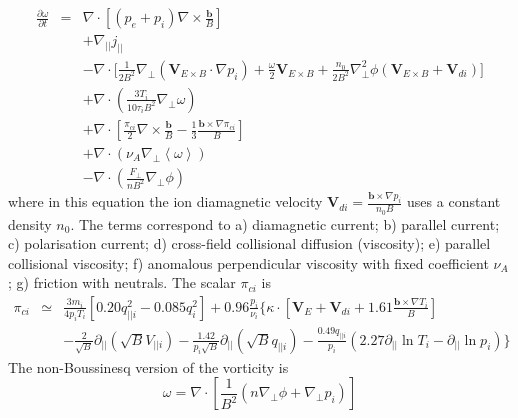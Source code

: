 \documentclass[12pt,a4paper]{article}
\begin{document}
\begin{subequations}
\begin{eqnarray}
%
%
  \frac{\partial\omega}{\partial t} &=& \nabla\cdot\left[\left(p_e + p_i\right)\nabla\times\frac{\mathbf{b}}{B}\right] \label{eq:vort_diamag} \\
  && + \nabla_{||}j_{||} \label{eq:vort_jpar} \\
  && - \nabla\cdot\Big[ \frac{1}{2B^2}\nabla_\perp\left(\mathbf{V}_{E\times B}\cdot\nabla p_i\right) + \frac{\omega}{2}\mathbf{V}_{E\times B}  +\frac{n_0}{2B^2}\nabla_\perp^2\phi \left(\mathbf{V}_{E\times B} + \mathbf{V}_{di}\right) \Big] \label{eq:vort_c} \\
  && + \nabla\cdot\left(\frac{3T_i}{10\tau_iB^2}\nabla_\perp\omega\right) \label{eq:vort_perpvis} \\
  && + \nabla\cdot\left[\frac{\pi_{ci}}{2}\nabla\times\frac{\mathbf{b}}{B} - \frac{1}{3}\frac{\mathbf{b}\times\nabla\pi_{ci}}{B}\right] \\
  && + \nabla\cdot\left(\nu_A\nabla_\perp\left<\omega\right>\right) \\
  && - \nabla\cdot\left(\frac{F_\perp}{nB^2}\nabla_\perp\phi\right)
\end{eqnarray}
\end{subequations}
where in this equation the ion diamagnetic velocity $\mathbf{V}_{di} = \frac{\mathbf{b}\times\nabla p_i}{n_0 B}$ uses a constant density $n_0$. The terms correspond to a) diamagnetic current; b) parallel current; c) polarisation current; d) cross-field collisional diffusion (viscosity); e) parallel collisional viscosity; f) anomalous perpendicular viscosity with fixed coefficient $\nu_A$; g) friction with neutrals. The scalar $\pi_{ci}$ is
\begin{eqnarray}
  \pi_{ci} &\simeq& \frac{3m_i}{4p_iT_i}\left[0.20q_{||i}^2 - 0.085q_i^2\right] + 0.96\frac{p_i}{\nu_i}\Bigg\{\kappa\cdot\left[\mathbf{V}_E + \mathbf{V}_{di} + 1.61\frac{\mathbf{b}\times\nabla T_i}{B}\right] \nonumber \\
  && - \frac{2}{\sqrt{B}}\partial_{||}\left(\sqrt{B}V_{||i}\right) - \frac{1.42}{p_i\sqrt{B}}\partial_{||}\left(\sqrt{B}q_{||i}\right) - \frac{0.49q_{||i}}{p_i}\left(2.27\partial_{||}\ln T_i - \partial_{||}\ln p_i\right)\Bigg\} \label{eq:pi_ci}
\end{eqnarray}
The non-Boussinesq version of the vorticity is
\begin{equation}
\omega = \nabla\cdot\left[\frac{1}{B^2}\left(n\nabla_\perp\phi + \nabla_\perp p_i\right)\right]
\end{equation}
\end{document}
